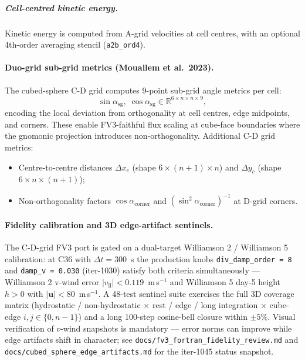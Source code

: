 \documentclass[11pt,twoside]{report}
\newcommand{\vect}[1]{\bm{#1}}
\begin{document}
\subparagraph{Cell-centred kinetic energy.}
Kinetic energy is computed from A-grid velocities at cell centres, with
an optional 4th-order averaging stencil (\texttt{a2b\_ord4}).

\paragraph{Duo-grid sub-grid metrics (Mouallem et al.\ 2023).}
The cubed-sphere C-D grid computes 9-point sub-grid angle metrics per cell:
\begin{equation}
  \sin\alpha_{\mathrm{sg}},\;\cos\alpha_{\mathrm{sg}} \in \mathbb{R}^{6 \times n \times n \times 9},
\end{equation}
encoding the local deviation from orthogonality at cell centres, edge
midpoints, and corners.  These enable FV3-faithful flux scaling at
cube-face boundaries where the gnomonic projection introduces
non-orthogonality.  Additional C-D grid metrics:
\begin{itemize}[nosep]
  \item Centre-to-centre distances $\Delta x_c$ (shape $6 \times (n\!+\!1) \times n$)
    and $\Delta y_c$ (shape $6 \times n \times (n\!+\!1)$);
  \item Non-orthogonality factors $\cos\alpha_{\mathrm{corner}}$ and
    $(\sin^2\!\alpha_{\mathrm{corner}})^{-1}$ at D-grid corners.
\end{itemize}

\paragraph{Fidelity calibration and 3D edge-artifact sentinels.}
The C-D-grid FV3 port is gated on a dual-target Williamson 2 / Williamson 5
calibration: at C36 with $\Delta t=300$~s the production knobs
\texttt{div\_damp\_order = 8} and \texttt{damp\_v = 0.030} (iter-1030)
satisfy both criteria simultaneously --- Williamson 2 v-wind error
$|v_{\mathrm{ll}}|<0.119$~m\,s$^{-1}$ and Williamson 5 day-5 height
$h>0$ with $|\vect{u}|<80$~m\,s$^{-1}$.  A 48-test sentinel suite
exercises the full 3D coverage matrix
(hydrostatic / non-hydrostatic $\times$ rest / edge / long
integration $\times$ cube-edge $i,j\in\{0,n{-}1\}$) and a long
100-step cosine-bell closure within $\pm 5\%$.  Visual verification
of $v$-wind snapshots is mandatory --- error norms can improve while
edge artifacts shift in character; see \texttt{docs/fv3\_fortran\_fidelity\_review.md}
and \texttt{docs/cubed\_sphere\_edge\_artifacts.md} for the iter-1045
status snapshot.
\end{document}

